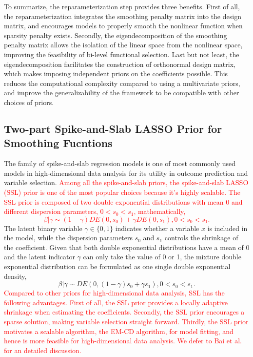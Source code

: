 \documentclass[AMA,STIX1COL,]{WileyNJD-v2}
\begin{document}
To summarize, the reparameterization step provides three benefits. First
of all, the reparameterization integrates the smoothing penalty matrix
into the design matrix, and encourages models to properly smooth the
nonlinear function when sparsity penalty exists. Secondly, the
eigendecomposition of the smoothing penalty matrix allows the isolation
of the linear space from the nonlinear space, improving the feasibility
of bi-level functional selection. Last but not least, the
eigendecomposition facilitates the construction of orthonormal design
matrix, which makes imposing independent priors on the coefficients
possible. This reduces the computational complexity compared to using a
multivariate priors, and improve the generalizability of the framework
to be compatible with other choices of priors.

\subsection{Two-part Spike-and-Slab LASSO Prior for Smoothing Fucntions}\label{sec:method_prior}

The family of spike-and-slab regression models is one of most commonly
used models in high-dimensional data analysis for its utility in outcome
prediction and variable selection.
\textcolor{red}{Among all the spike-and-slab priors, the spike-and-slab LASSO (SSL) prior \cite{Rockova2018b, Rockova2018} is one of the most popular choices because it's highly scalable. The SSL prior is composed of two double exponential distributions with mean 0 and different dispersion parameters, $0 < s_0 < s_1$, mathematically,
\begin{equation} 
\beta | \gamma \sim (1-\gamma)DE(0, s_0) + \gamma DE(0, s_1), 0 < s_0 < s_1.\nonumber
\end{equation}
} The latent binary variable \(\gamma \in \{0,1\}\) indicates whether a
variable \(x\) is included in the model, while the dispersion parameters
\(s_0\) and \(s_1\) controls the shrinkage of the coefficient. Given
that both double exponential distributions have a mean of 0 and the
latent indicator \(\gamma\) can only take the value of 0 or 1, the
mixture double exponential distribution can be formulated as one single
double exponential density, \begin{equation} \label{eq:ssl}
\beta | \gamma \sim DE(0, (1-\gamma)s_0 + \gamma s_1), 0 < s_0 < s_1.
\end{equation}
\textcolor{red}{Compared to other priors for high-dimensional data analysis, SSL has the following advantages. First of all, the SSL prior provides a locally adaptive shrinkage when estimating the coefficients. Secondly, the SSL prior encourages a sparse solution, making variable selection straight forward. Thirdly, the SSL prior motivates a scalable algorithm, the EM-CD algorithm, for model fitting, and hence is more feasible for high-dimensional data analysis. We defer to Bai et al. \cite{Bai2021Review} for an detailed discussion.}
\end{document}

